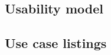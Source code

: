 \documentclass{article}
\begin{document}
\subsection{Usability model}
\subsection{Use case listings}
\end{document}
